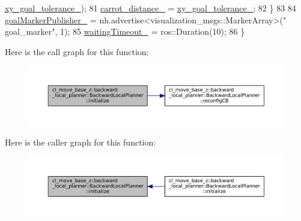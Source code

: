 \begin{DoxyCode}
      \hyperlink{classcl__move__base__z_1_1backward__local__planner_1_1BackwardLocalPlanner_aa4ec2c87947a3c08f8278eff052e7c8c}{xy\_goal\_tolerance\_});
81                 \hyperlink{classcl__move__base__z_1_1backward__local__planner_1_1BackwardLocalPlanner_a0bbb80ce5bae865c4322869422803296}{carrot\_distance\_} = \hyperlink{classcl__move__base__z_1_1backward__local__planner_1_1BackwardLocalPlanner_aa4ec2c87947a3c08f8278eff052e7c8c}{xy\_goal\_tolerance\_};
82             \}
83 
84             \hyperlink{classcl__move__base__z_1_1backward__local__planner_1_1BackwardLocalPlanner_a79f0ddfa686e2cd47bbc2f0bac9f3d4c}{goalMarkerPublisher\_} = nh.advertise<visualization\_msgs::MarkerArray>(\textcolor{stringliteral}{"
      goal\_marker"}, 1);
85             \hyperlink{classcl__move__base__z_1_1backward__local__planner_1_1BackwardLocalPlanner_a0c15da985f7f051164adb643c03a0c90}{waitingTimeout\_} = ros::Duration(10);
86         \}
\end{DoxyCode}
Here is the call graph for this function\+:
\nopagebreak
\begin{figure}[H]
\begin{center}
\leavevmode
\includegraphics[width=350pt]{classcl__move__base__z_1_1backward__local__planner_1_1BackwardLocalPlanner_a5c9815019cef272faed835cd8c575196_cgraph}
\end{center}
\end{figure}
Here is the caller graph for this function\+:
\nopagebreak
\begin{figure}[H]
\begin{center}
\leavevmode
\includegraphics[width=350pt]{classcl__move__base__z_1_1backward__local__planner_1_1BackwardLocalPlanner_a5c9815019cef272faed835cd8c575196_icgraph}
\end{center}
\end{figure}
\mbox{\label{classcl__move__base__z_1_1backward__local__planner_1_1BackwardLocalPlanner_a06a99e609ed31b97f765351dd6827722}} 
